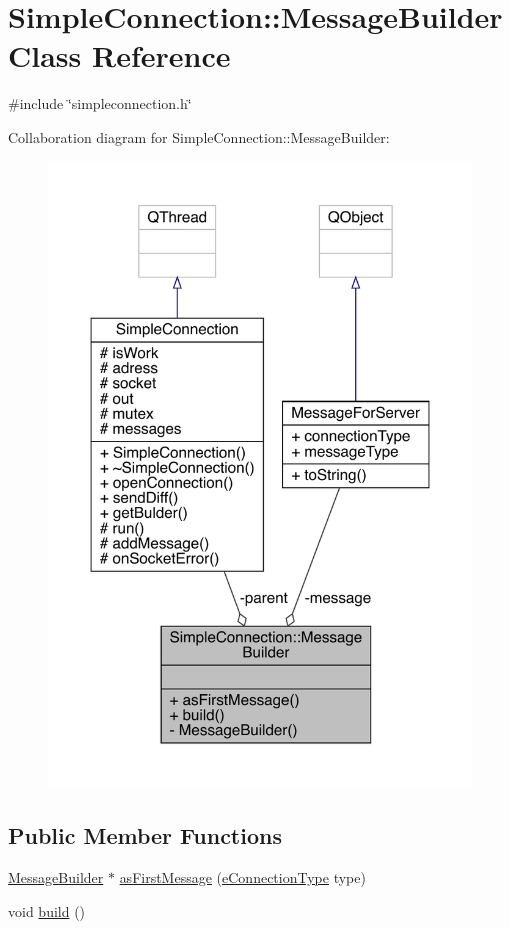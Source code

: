 \hypertarget{a00129}{}\section{Simple\+Connection\+:\+:Message\+Builder Class Reference}
\label{a00129}


{\ttfamily \#include \char`\"{}simpleconnection.\+h\char`\"{}}



Collaboration diagram for Simple\+Connection\+:\+:Message\+Builder\+:
\nopagebreak
\begin{figure}[H]
\begin{center}
\leavevmode
\includegraphics[width=350pt]{df/dcd/a00127}
\end{center}
\end{figure}
\subsection*{Public Member Functions}
\begin{DoxyCompactItemize}
\item 
\hyperlink{a00129}{Message\+Builder} $\ast$ \hyperlink{a00129_ae54a2b522f87b6cbab31d9ee27f29264}{as\+First\+Message} (\hyperlink{a00008_ab66d8802c50493de7d50e181d6f8e296}{e\+Connection\+Type} type)
\item 
void \hyperlink{a00129_ac39d9787cbea1c6d81a7cdbc736c9061}{build} ()
\end{DoxyCompactItemize}
